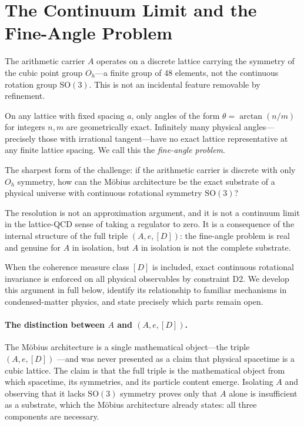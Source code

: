 \documentclass[12pt,letterpaper]{article}
\newcommand{\Dclass}{[D]}
\begin{document}
\section{The Continuum Limit and the Fine-Angle Problem}
\label{sec:continuum}

The arithmetic carrier $A$ operates on a discrete lattice carrying the symmetry of
the cubic point group $O_h$---a finite group of 48 elements, not the continuous
rotation group $\mathrm{SO}(3)$.  This is not an incidental feature removable by
refinement.

On any lattice with fixed spacing $a$, only angles of the form
$\theta = \arctan(n/m)$ for integers $n,m$ are geometrically exact.  Infinitely
many physical angles---precisely those with irrational tangent---have no exact
lattice representative at any finite lattice spacing.  We call this the
\emph{fine-angle problem}.

The sharpest form of the challenge: if the arithmetic carrier is discrete with only
$O_h$ symmetry, how can the M\"{o}bius architecture be the exact substrate of a physical
universe with continuous rotational symmetry $\mathrm{SO}(3)$?

The resolution is not an approximation argument, and it is not a continuum limit
in the lattice-QCD sense of taking a regulator to zero.  It is a consequence of the
internal structure of the full triple $(A, e, \Dclass)$: the fine-angle problem is
real and genuine for $A$ in isolation, but $A$ in isolation is not the complete
substrate.

When the coherence measure class $\Dclass$ is included, exact continuous rotational
invariance is enforced on all physical observables by constraint D2.  We develop
this argument in full below, identify its relationship to familiar mechanisms in
condensed-matter physics, and state precisely which parts remain open.

\paragraph{The distinction between $A$ and $(A, e, \Dclass)$.}

The M\"{o}bius architecture is a single mathematical object---the triple $(A, e, \Dclass)$
---and was never presented as a claim that physical spacetime is a cubic lattice.
The claim is that the full triple is the mathematical object from which spacetime,
its symmetries, and its particle content emerge.  Isolating $A$ and observing that
it lacks $\mathrm{SO}(3)$ symmetry proves only that $A$ alone is insufficient as a
substrate, which the M\"{o}bius architecture already states: all three components are
necessary.
\end{document}
